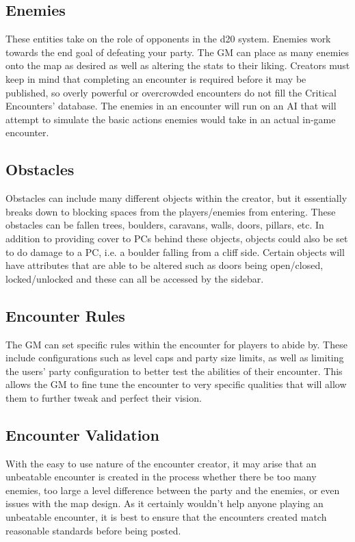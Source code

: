 \documentclass[12pt,a4paper]{report}
\begin{document}
		\subsection{Enemies}
		These entities take on the role of opponents in the d20 system. Enemies work towards the end goal of defeating your party. The GM can place as many enemies onto the map as desired as well as altering the stats to their liking. Creators must keep in mind that completing an encounter is required before it may be published, so overly powerful or overcrowded encounters do not fill the Critical Encounters' database. The enemies in an encounter will run on an AI that will attempt to simulate the basic actions enemies would take in an actual in-game encounter.
		\subsection{Obstacles}
		Obstacles can include many different objects within the creator, but it essentially breaks down to blocking spaces from the players/enemies from entering. These obstacles can be fallen trees, boulders, caravans, walls, doors, pillars, etc. In addition to providing cover to PCs behind these objects, objects could also be set to do damage to a PC, i.e. a boulder falling from a cliff side. Certain objects will have attributes that are able to be altered such as doors being open/closed, locked/unlocked and these can all be accessed by the sidebar.
		\subsection{Encounter Rules}
		The GM can set specific rules within the encounter for players to abide by. These include configurations such as level caps and party size limits, as well as limiting the users' party configuration to better test the abilities of their encounter. This allows the GM to fine tune the encounter to very specific qualities that will allow them to further tweak and perfect their vision.
		\subsection{Encounter Validation}
		With the easy to use nature of the encounter creator, it may arise that an unbeatable encounter is created in the process whether there be too many enemies, too large a level difference between the party and the enemies, or even issues with the map design. As it certainly wouldn't help anyone playing an unbeatable encounter, it is best to ensure that the encounters created match reasonable standards before being posted. 
		
\end{document}
